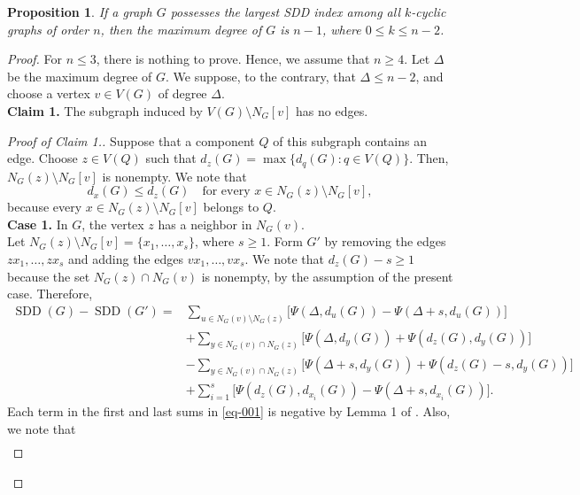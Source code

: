 \documentclass[10pt,a4paper]{amsart}
\newtheorem{proposition}{Proposition}
\newcommand{\SDD}{\operatorname{SDD}}
\begin{document}
\begin{proposition}\cite{AlbalahiAli2022}\label{thm:main}
If a graph $G$ possesses the largest SDD index
among all $k$-cyclic graphs of order $n$, then the maximum degree of $G$ is $n-1$, where $0\le k\le n-2$.
\end{proposition}

\begin{proof}
For $n\le 3$, there is nothing to prove. Hence, we assume that $n\ge 4$. Let $\Delta$ be the maximum degree of $G$. We suppose, to the contrary, that $\Delta\le n-2$,
and choose a vertex $v\in V(G)$ of degree $\Delta$. \\[2mm]
{\bf Claim 1.}    The
subgraph induced by $V(G)\setminus N_G[v]$ has no edges.



\begin{proof}[Proof of Claim 1.]
    Suppose that a component $Q$ of this subgraph contains an edge. Choose
$z\in V(Q)$ such that $d_z(G)=\max\{d_q(G):q\in V(Q)\}$. Then, $N_G(z)\setminus N_G[v]$ is nonempty. We note that
\begin{equation}\label{eq:Q-maximum}
d_x(G)\le d_z(G)
\quad\text{for every }x\in N_G(z)\setminus N_G[v],
\end{equation}
because every
$x\in N_G(z)\setminus N_G[v]$ belongs to $Q$.\\[2mm]
{\bf Case 1.} In $G$, the vertex $z$ has a neighbor in $N_G(v)$.\\
Let
$N_G(z)\setminus N_G[v]=\{x_1,\ldots,x_s\}$, where $s\ge1$. Form
$G'$ by removing the edges $zx_1,\dots,zx_s$ and adding the edges $vx_1,\dots,vx_s$. We note that
$d_z(G)-s\ge1$ because the set $N_G(z)\cap N_G(v)$ is nonempty, by the
assumption of the present case.
Therefore,
\begin{align}\label{eq-001}
\SDD(G)-\SDD(G')
={}&\sum_{u\in N_G(v)\setminus N_G(z)}
 \bigl[\Psi(\Delta,d_u(G))-\Psi(\Delta+s,d_u(G))\big]\nonumber\\
&+\sum_{y\in N_G(v)\cap N_G(z)}
 \bigl[\Psi(\Delta,d_y(G))+\Psi(d_z(G),d_y(G))\big]\nonumber\\
&-\sum_{y\in N_G(v)\cap N_G(z)}
 \bigl[\Psi(\Delta+s,d_y(G))
       +\Psi(d_z(G)-s,d_y(G))\big]\nonumber\\
&+\sum_{i=1}^{s}
 \bigl[\Psi(d_z(G),d_{x_i}(G))
       -\Psi(\Delta+s,d_{x_i}(G))\big].
\end{align}
Each term in the first and last sums in \eqref{eq-001} is negative by Lemma 1 of \cite{AlbalahiAli2022}. Also, we note that
\begin{align*}

\end{align*}
\end{proof}
\end{proof}
\end{document}
